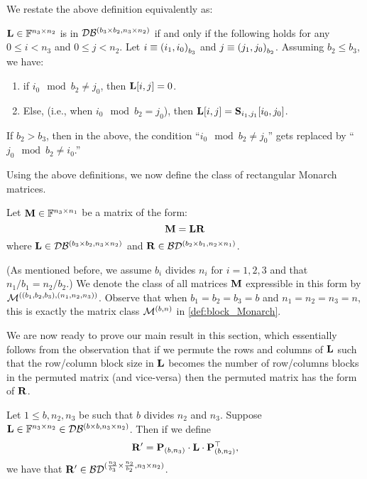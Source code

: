 We restate the above definition equivalently as:


\begin{proposition}
\label{prop:rect-L-eqv-def}
$\mathbf{L}\in\mathbb{F}^{n_3\times n_2}$ is in $\mathcal{D}\mathcal{B}^{(b_3 \times b_2, n_3 \times n_2)}$ if and only if the following holds for any
$0\le i < n_3$ and $0 \le j< n_2$. Let $i\equiv\left( {{i_1},{i_0}}\right)_{{b_3}}$ and $j\equiv\left( {{j_1},{j_0}}\right)_{{b_2}}$.  Assuming $b_2 \le b_3$, we have:
\begin{enumerate}
    \item\label{item:rect-zero-loc-L} if $i_0\mod{b_2}\ne j_0$, then $\mathbf{L}[i,j]=0$. 
    \item \label{item:rect-nonzero-loc-L} Else, (i.e., when $i_0\mod{b_2}=j_0$), then $\mathbf{L}[i,j]=\mathbf{S}_{i_1,j_1}[i_0,j_0]$.
\end{enumerate}
If $b_2>b_3$, then in the above, the condition ``$i_0\mod{b_2}\ne j_0$'' gets replaced by ``$j_0\mod{b_2}\ne i_0$.''
\end{proposition}

Using the above definitions, we now define the class of rectangular Monarch matrices.
\begin{definition}
\label{def:block_Monarch}
Let $\mathbf{M} \in \mathbb{F}^{n_3 \times n_1}$ be a matrix of the form: 
    \begin{equation}
        	\label{eq:Monarch-general}
    \mathbf{M}= \mathbf{L} \mathbf{R}
    \end{equation}
    where $\mathbf{L} \in \mathcal{D}\mathcal{B}^{(b_3 \times b_2, n_3 \times n_2)}$ and $\mathbf{R} \in \mathcal{B}\mathcal{D}^{(b_2 \times b_1, n_2 \times n_1)}$.
\end{definition}
(As mentioned before, we assume $b_i$ divides $n_i$ for $i = 1,2,3$ and that $n_1/b_1 = n_2/b_2$.)
We denote the class of all matrices $\mathbf{M}$ expressible in this form by $\mathcal{M}^{((b_1,b_2,b_3), (n_1,n_2,n_3))}$. Observe that when $b_1 = b_2 = b_3 = b$ and $n_1 = n_2 = n_3 = n$, this is exactly the matrix class $\mathcal{M}^{(b, n)}$ in \cref{def:block_Monarch}.

We are now ready to prove our main result in this section, which essentially follows from the observation that if we permute the rows and columns of $\mathbf{L}$ such that the row/column block size in $\mathbf{L}$ becomes the number of row/columns blocks in the permuted matrix (and vice-versa) then the permuted matrix has the form of $\mathbf{R}$.


\begin{theorem} Let $1\le b,n_2,n_3$ be such that $b$ divides $n_2$ and $n_3$.
Suppose $\mathbf{L}\in\mathbb{F}^{n_3\times n_2} \in \mathcal{D}\mathcal{B}^{(b \times b, n_3 \times n_2)}$.
Then if we define
\[\mathbf{R}'=\mathbf{P}_{(b,n_3)}\cdot\mathbf{L}\cdot\mathbf{P}_{(b,n_2)}^\top,\]
we have that $\mathbf{R}' \in \mathcal{B}\mathcal{D}^{(\frac{n_3}{b_3} \times \frac{n_2}{b_2}, n_3 \times n_2)}$.
\end{theorem}


